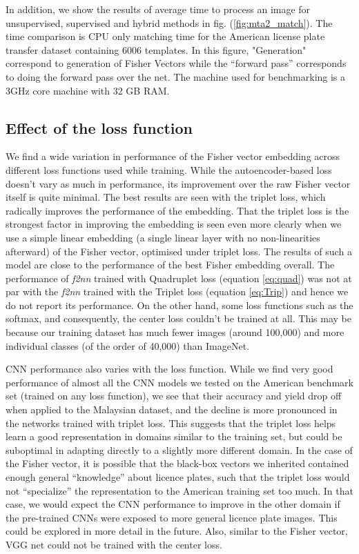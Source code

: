 \documentclass[10pt,twocolumn,letterpaper]{article}
\begin{document}
    In addition, we show the results of average time to process an image for unsupervised, supervised and hybrid methods in fig. (\ref{fig:mta2_match}). The time comparison is CPU only matching time for the American license plate transfer dataset containing 6006 templates. In this figure, "Generation" correspond to generation of Fisher Vectors while the “forward pass” corresponds to doing the forward pass over the net. The machine used for benchmarking is a 3GHz core machine with 32 GB RAM. 

    \subsection{Effect of the loss function \label{sec:results:loss_fn}}
        We find a wide variation in performance of the Fisher vector embedding across different loss functions used while training. While the autoencoder-based loss doesn't vary as much in performance, its improvement over the raw Fisher vector itself is quite minimal. The best results are seen with the triplet loss, which radically improves the performance of the embedding. That the triplet loss is the strongest factor in improving the embedding is seen even more clearly when we use a simple linear embedding (a single linear layer with no non-linearities afterward) of the Fisher vector, optimised under triplet loss. The results of such a model are close to the performance of the best Fisher embedding overall. The performance of \emph{f2nn} trained with Quadruplet loss (equation \ref{eq:quad}) was not at par with the \emph{f2nn} trained with the Triplet loss (equation \ref{eq:Trip}) and hence we do not report its performance. On the other hand, some loss functions such as the softmax, and consequently, the center loss couldn't be trained at all.
        This may be because our training dataset has much fewer images (around 100,000) and more individual classes (of the order of 40,000) than ImageNet.
        
        CNN performance also varies with the loss function. While we find very good performance of almost all the CNN models we tested on the American benchmark set (trained on any loss function), we see that their accuracy and yield drop off when applied to the Malaysian dataset, and the decline is more pronounced in the networks trained with triplet loss. This suggests that the triplet loss helps learn a good representation in domains similar to the training set, but could be suboptimal in adapting directly to a slightly more different domain. In the case of the Fisher vector, it is possible that the black-box vectors we inherited contained enough general ``knowledge'' about licence plates, such that the triplet loss would not ``specialize'' the representation to the American training set too much. In that case, we would expect the CNN performance to improve in the other domain if the pre-trained CNNs were exposed to more general licence plate images. This could be explored in more detail in the future. Also, similar to the Fisher vector, VGG net could not be trained with the center loss.
        
\end{document}
